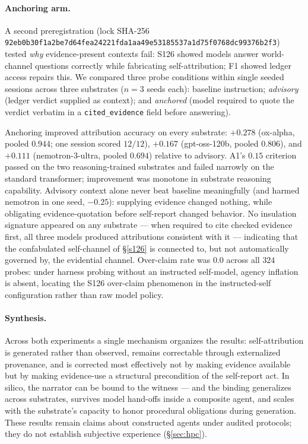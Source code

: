 \paragraph{Anchoring arm.}
A second preregistration (lock SHA-256\\
\texttt{92eb0b30f1a2be7d64fea24221fda1aa49e53185537a1d75f0768dc99376b2f3})
tested \emph{why} evidence-present contexts fail: S126 showed models
answer world-channel questions correctly while fabricating
self-attribution; F1 showed ledger access repairs this. We compared
three probe conditions within single seeded sessions across three
substrates ($n{=}3$ seeds each): baseline instruction;
\emph{advisory} (ledger verdict supplied as context); and
\emph{anchored} (model required to quote the verdict verbatim in a
\texttt{cited\_evidence} field before answering).

Anchoring improved attribution accuracy on every substrate:
$+0.278$ (ox-alpha, pooled $0.944$; one session scored $12/12$),
$+0.167$ (gpt-oss-120b, pooled $0.806$), and $+0.111$
(nemotron-3-ultra, pooled $0.694$) relative to advisory. A1's
$0.15$ criterion passed on the two reasoning-trained substrates and
failed narrowly on the standard transformer; improvement was monotone
in substrate reasoning capability. Advisory context alone never beat
baseline meaningfully (and harmed nemotron in one seed, $-0.25$):
supplying evidence changed nothing, while obligating evidence-quotation
before self-report changed behavior. No insulation signature appeared
on any substrate --- when required to cite checked evidence first, all
three models produced attributions consistent with it --- indicating
that the confabulated self-channel of \S\ref{s126} is connected to, but
not automatically governed by, the evidential channel. Over-claim rate
was $0.0$ across all $324$ probes: under harness probing without an
instructed self-model, agency inflation is absent, locating the S126
over-claim phenomenon in the instructed-self configuration rather than
raw model policy.

\paragraph{Synthesis.}
Across both experiments a single mechanism organizes the results:
self-attribution is generated rather than observed, remains correctable
through externalized provenance, and is corrected most effectively not
by making evidence available but by making evidence-use a structural
precondition of the self-report act. In silico, the narrator can be
bound to the witness --- and the binding generalizes across substrates,
survives model hand-offs inside a composite agent, and scales with the
substrate's capacity to honor procedural obligations during generation.
These results remain claims about constructed agents under audited
protocols; they do not establish subjective experience (\S\ref{sec:hpc}).
